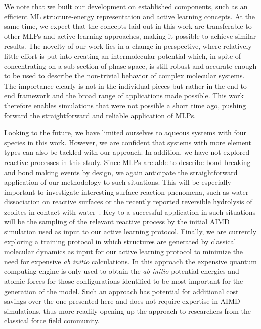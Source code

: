 \documentclass[aip,jcp,amsmath,amssymb,floatfix,reprint,citeautoscript,noeprint]{revtex4-1}
\begin{document}
\begin{bibunit}
We note that we built our development on established components, such as an efficient ML structure-energy representation and active learning concepts.
%
At the same time, we expect that the concepts laid out in this work are transferable to other MLPs and active learning approaches, making it possible to achieve similar results.
%
The novelty of our work lies in a change in perspective, where relatively little effort is put into creating an intermolecular potential which, in spite of concentrating on a sub-section of phase space, is still robust and accurate enough to be used to describe the non-trivial behavior of complex molecular systems.
%
The importance clearly is not in the individual pieces but rather in the end-to-end framework and the broad range of applications made possible.
%
This work therefore enables simulations that were not possible a short time ago, pushing forward the straightforward and reliable application of MLPs.

Looking to the future, we
have limited ourselves to aqueous systems with four species in this work.
%
However, we are confident that systems with more element types can also be tackled
with our approach.
%
In addition, we have not explored reactive processes in this study. 
%
Since MLPs are able to describe bond breaking and bond making events by design, we again anticipate the straightforward application of our methodology to such situations.
%
This will be especially important to investigate interesting surface reaction phenomena, such as water dissociation on reactive surfaces or the recently reported reversible hydrolysis of zeolites in contact with water~\cite{Heard2019/10.1038/s41467-019-12752-y}.
%
Key to a successful application in such situations will be the sampling of the relevant reactive process by the initial AIMD simulation used as input to our active learning protocol.
%
%
%
%
%
%
%
%
%
%
%
%
%
%
%
%
%
%
%
%
%
Finally, we are currently exploring a training protocol in which structures are generated by classical molecular dynamics as input for our active learning protocol to minimize the
need for expensive \textit{ab initio} calculations.
%
In this approach the expensive quantum computing engine is only used to obtain the \textit{ab initio} potential energies and atomic forces for those configurations identified to be most important for the generation of the model.
%
Such an approach has potential for additional cost savings over the one presented here and does not require expertise in AIMD simulations, thus more readily opening up the approach to researchers from the classical force field community.
%




\end{bibunit}
\end{document}
